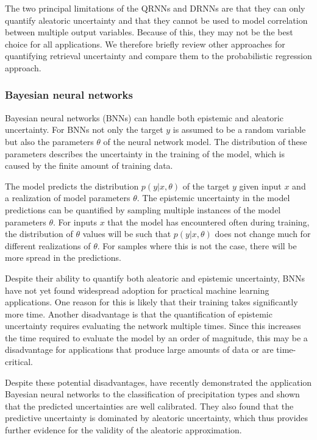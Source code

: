 \begin{description}
The two principal limitations of the QRNNs and DRNNs are that they can only
quantify aleatoric uncertainty and that they cannot be used to model correlation
between multiple output variables. Because of this, they may not be the best
choice for all applications. We therefore briefly review other approaches for
quantifying retrieval uncertainty and compare them to the probabilistic
regression approach.

\subsubsection{Bayesian neural networks}

Bayesian neural networks (BNNs) can handle both epistemic and aleatoric
uncertainty. For BNNs not only the target $y$ is assumed to be a random variable
but also the parameters $\theta$ of the neural network model. The distribution
of these parameters describes the uncertainty in the training of the model,
which is caused by the finite amount of training data.

The model predicts the distribution $p(y|x, \theta)$ of the target $y$ given
input $x$ and a realization of model parameters $\theta$. The epistemic
uncertainty in the model predictions can be quantified by sampling multiple
instances of the model parameters $\theta$. For inputs $x$ that the model has
encountered often during training, the distribution of $\theta$ values will be
such that $p(y|x, \theta)$ does not change much for different realizations of
$\theta$. For samples where this is not the case, there will be more spread in
the predictions.

Despite their ability to quantify both aleatoric and epistemic uncertainty, BNNs
have not yet found widespread adoption for practical machine learning
applications. One reason for this is likely that their training takes
significantly more time. Another disadvantage is that the quantification of
epistemic uncertainty requires evaluating the network multiple times. Since
this increases the time required to evaluate the model by an order of magnitude,
this may be a disadvantage for applications that produce large amounts of
data or are time-critical.

Despite these potential disadvantages, \citet{orescanin22} have recently
demonstrated the application Bayesian neural networks to the classification of
precipitation types and shown that the predicted uncertainties are well
calibrated. They also found that the predictive uncertainty is dominated by
aleatoric uncertainty, which thus provides further evidence for the
validity of the aleatoric approximation.


\end{description}

